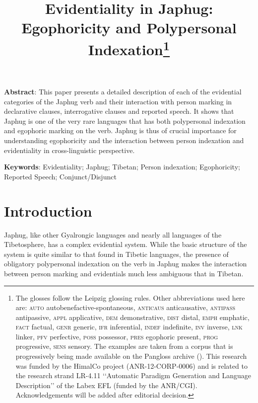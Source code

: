 \documentclass[oldfontcommands,oneside,a4paper,11pt]{article}
\begin{document}
 
\title{Evidentiality in Japhug: Egophoricity and Polypersonal Indexation\footnote{ The glosses follow the Leipzig glossing rules. Other abbreviations used here are: \textsc{auto}  autobenefactive-spontaneous, \textsc{anticaus} anticausative, \textsc{antipass} antipassive, \textsc{appl} applicative, \textsc{dem} demonstrative,  \textsc{dist} distal, \textsc{emph} emphatic, \textsc{fact} factual, \textsc{genr} generic, \textsc{ifr} inferential, \textsc{indef} indefinite, \textsc{inv} inverse,  \textsc{lnk} linker, \textsc{pfv} perfective, \textsc{poss} possessor, \textsc{pres} egophoric present, \textsc{prog} progressive, \textsc{sens} sensory. The examples are taken from a corpus that is progressively being made available on the Pangloss archive (\citealt{michailovsky14pangloss}). This research was funded by the HimalCo project (ANR-12-CORP-0006) and is related to the research strand LR-4.11 ‘‘Automatic Paradigm Generation and Language Description’’ of the Labex EFL (funded by the ANR/CGI). Acknowledgements   will be added after editorial decision. %
} }
\maketitle
\linenumbers


\textbf{Abstract}: This paper presents a detailed description of each of the evidential categories of the Japhug verb and their interaction with person marking in declarative clauses, interrogative clauses and reported speech. It shows that Japhug is one of the very rare languages that has both polypersonal indexation and egophoric marking on the verb. Japhug is thus of crucial importance for understanding egophoricity and the interaction between person indexation and evidentiality in cross-linguistic perspective.

\textbf{Keywords}: Evidentiality; Japhug; Tibetan; Person indexation; Egophoricity; Reported Speech; Conjunct/Disjunct

\section{Introduction}
Japhug, like other Gyalrongic languages and nearly all languages of the Tibetosphere, has a complex evidential system. While the basic structure of the system is quite similar to that found in Tibetic languages, the presence of obligatory polypersonal indexation on the verb in Japhug makes the interaction between person marking and evidentials much less ambiguous that in Tibetan.
\end{document}
